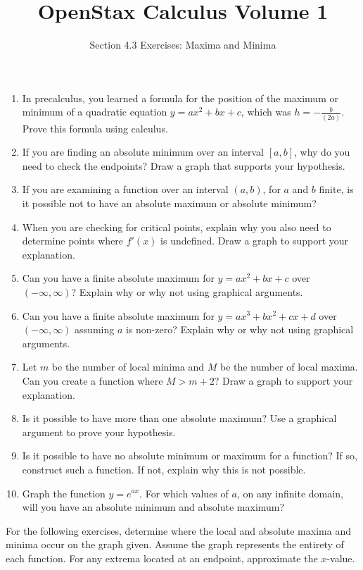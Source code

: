 \documentclass{exercises}
\title{OpenStax Calculus Volume 1}
\subtitle{Section 4.3 Exercises: Maxima and Minima}
\author{}
\date{}
\begin{document}
\maketitle

\begin{enumerate}[start=1]
\item In precalculus, you learned a formula for the position of the maximum or minimum of a quadratic equation $y=ax^{2}+bx+c$, which was $h=-\frac{b}{(2a)}$. Prove this formula using calculus.
\item If you are finding an absolute minimum over an interval $[a,b]$, why do you need to check the endpoints? Draw a graph that supports your hypothesis.
\item If you are examining a function over an interval $(a,b)$, for $a$ and $b$ finite, is it possible not to have an absolute maximum or absolute minimum?
\item When you are checking for critical points, explain why you also need to determine points where $f'(x)$ is undefined. Draw a graph to support your explanation.
\item Can you have a finite absolute maximum for $y=ax^{2}+bx+c$ over $(-\infty,\infty)$? Explain why or why not using graphical arguments.
\item Can you have a finite absolute maximum for $y=ax^{3}+bx^{2}+cx+d$ over $(-\infty,\infty)$ assuming $a$ is non-zero? Explain why or why not using graphical arguments.
\item Let $m$ be the number of local minima and $M$ be the number of local maxima. Can you create a function where $M>m+2$? Draw a graph to support your explanation.
\item Is it possible to have more than one absolute maximum? Use a graphical argument to prove your hypothesis.
\item Is it possible to have no absolute minimum or maximum for a function? If so, construct such a function. If not, explain why this is not possible.
\item \techrequired Graph the function $y=e^{ax}$. For which values of $a$, on any infinite domain, will you have an absolute minimum and absolute maximum?
\end{enumerate}

For the following exercises, determine where the local and absolute maxima and minima occur on the graph given. Assume the graph represents the entirety of each function. For any extrema located at an endpoint, approximate the $x$-value.
\end{document}
